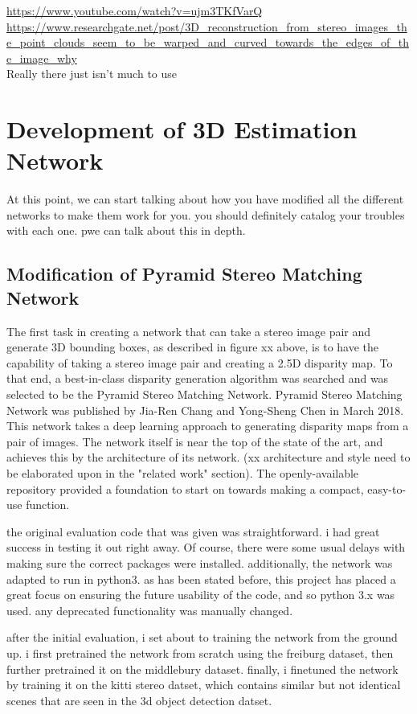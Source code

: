 \url{https://www.youtube.com/watch?v=ujm3TKfVarQ}\\
\url{https://www.researchgate.net/post/3D_reconstruction_from_stereo_images_the_point_clouds_seem_to_be_warped_and_curved_towards_the_edges_of_the_image_why}\\
Really there just isn't much to use



\section{Development of 3D Estimation Network}
At this point, we can start talking about how you have modified all the different networks to make them work for you. you should definitely catalog your troubles with each one. pwe can talk about this in depth. 

\subsection{Modification of Pyramid Stereo Matching Network}
The first task in creating a network that can take a stereo image pair and generate 3D bounding boxes, as described in figure xx above, is to have the capability of taking a stereo image pair and creating a 2.5D disparity map. To that end, a best-in-class disparity generation algorithm was searched and was selected to be the Pyramid Stereo Matching Network. Pyramid Stereo Matching Network was published by Jia-Ren Chang and Yong-Sheng Chen in March 2018. This network takes a deep learning approach to generating disparity maps from a pair of images. The network itself is near the top of the state of the art, and achieves this by the architecture of its network. (xx architecture and style need to be elaborated upon in the "related work" section). The openly-available repository provided a foundation to start on towards making a compact, easy-to-use function. 

the original evaluation code that was given was straightforward. i had great success in testing it out right away. Of course, there were some usual delays with making sure the correct packages were installed. additionally, the network was adapted to run in python3. as has been stated before, this project has placed a great focus on ensuring the future usability of the code, and so python 3.x was used. any deprecated functionality was manually changed. 

after the initial evaluation, i set about to training the network from the ground up. i first pretrained the network from scratch using the freiburg dataset, then further pretrained it on the middlebury dataset. finally, i finetuned the network by training it on the kitti stereo datset, which contains similar but not identical scenes that are seen in the 3d object detection datset. 




